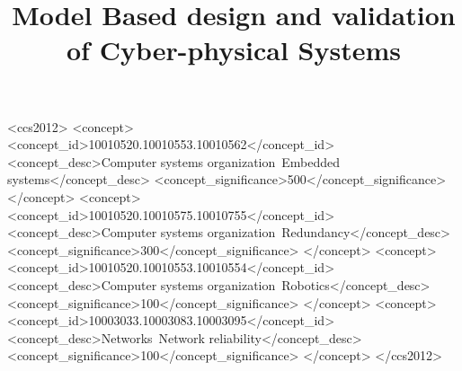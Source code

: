 \documentclass[sigconf]{acmart}
\begin{document}
%
%
\begin{CCSXML}
<ccs2012>
 <concept>
  <concept_id>10010520.10010553.10010562</concept_id>
  <concept_desc>Computer systems organization~Embedded systems</concept_desc>
  <concept_significance>500</concept_significance>
 </concept>
 <concept>
  <concept_id>10010520.10010575.10010755</concept_id>
  <concept_desc>Computer systems organization~Redundancy</concept_desc>
  <concept_significance>300</concept_significance>
 </concept>
 <concept>
  <concept_id>10010520.10010553.10010554</concept_id>
  <concept_desc>Computer systems organization~Robotics</concept_desc>
  <concept_significance>100</concept_significance>
 </concept>
 <concept>
  <concept_id>10003033.10003083.10003095</concept_id>
  <concept_desc>Networks~Network reliability</concept_desc>
  <concept_significance>100</concept_significance>
 </concept>
</ccs2012>
\end{CCSXML}





\maketitle
\title{Model Based design and validation of Cyber-physical Systems}





\end{document}
